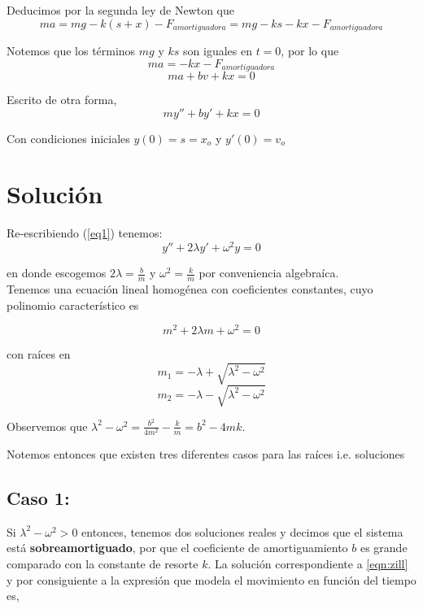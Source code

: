 \documentclass[11pt]{amsart}
\begin{document}
Deducimos por la segunda ley de Newton que
\[ma = mg - k(s+x) - F_{amortiguadora}  = mg - ks - kx - F_{amortiguadora}\]

Notemos que los t\'{e}rminos $mg$ y $ks$ son iguales en $t=0$, por lo que
\[ma = -kx - F_{amortiguadora}\]
\[ma + bv  + kx = 0\]

Escrito de otra forma, 
\begin{equation}
my''  + by' + kx = 0
\label{eq1}
\end{equation}

Con condiciones iniciales $y(0) = s = x_o$ y $y'(0) = v_o$

\vspace{1cm}
\section{Soluci\'{o}n}

Re-escribiendo (\ref{eq1}) tenemos:
\begin{equation}
y'' + 2\lambda y' + \omega^2 y =0 
\label{eqn:zill}
\end{equation}

en donde escogemos $2\lambda = \frac{b}{m}$ y $\omega^2 = \frac{k}{m}$ por conveniencia algebra\'{i}ca.  \\

Tenemos una ecuaci\'{o}n lineal homog\'{e}nea con coeficientes constantes, cuyo polinomio caracter\'{i}stico es 

\[ m^2 + 2\lambda m + \omega^2 = 0\]

con ra\'{i}ces en 
\[ m_1 = -\lambda + \sqrt{\lambda^2-\omega^2}\]
\[ m_2 = -\lambda - \sqrt{\lambda^2-\omega^2}\]

Observemos que $\lambda^2 - \omega^2  = \frac{b^2}{4m^2} - \frac{k}{m} = b^2 - 4mk$.

Notemos entonces que existen tres diferentes casos para las ra\'{i}ces i.e. soluciones

\vspace{1cm}


\subsection{Caso 1:} 
Si $\lambda^2 - \omega^2>0$ entonces, tenemos dos soluciones reales y decimos que el sistema est\'{a} \textbf{sobreamortiguado}, por que el coeficiente de amortiguamiento $b$ es grande comparado con la constante de resorte $k$. La soluci\'{o}n correspondiente a \ref{eqn:zill} y por consiguiente a la expresi\'{o}n que modela el movimiento en funci\'{o}n del tiempo es,
\end{document}
